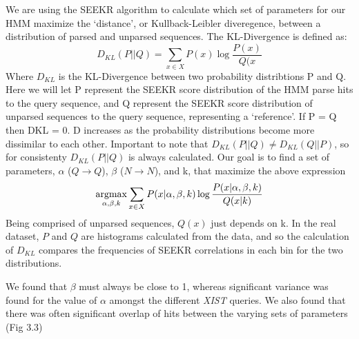 We are using the SEEKR algorithm to calculate which set of parameters for our HMM maximize the ‘distance’, or Kullback-Leibler diveregence, between a distribution of parsed and unparsed sequences.
The KL-Divergence is defined as:
\begin{equation}
    D_{KL}(P||Q) = \sum_{x\in X}P(x)\log{\frac{P(x)}{Q(x}}
\end{equation}
Where $D_{KL}$ is the KL-Divergence between two probability distribtions P and Q. Here we will let P represent the SEEKR score distribution of the HMM parse hits to the query sequence, and Q represent the SEEKR score distribution of unparsed sequences to the query sequence, representing a ‘reference’. If P = Q then DKL = 0. D increases as the probability distributions become more dissimilar to each other. Important to note that $D_{KL}(P||Q) \neq D_{KL}(Q||P)$, so for consistenty $D_{KL}(P||Q)$ is always calculated.
Our goal is to find a set of parameters, $\alpha$ ($Q\rightarrow Q$), $\beta$ ($N\rightarrow N$), and k, that maximize the above expression
\begin{equation}
    \operatorname*{argmax}_{\alpha,\beta,k}\sum_{x\in X}P(x|\alpha,\beta,k)\log{\frac{P(x|\alpha,\beta,k)}{Q(x|k)}}
\end{equation}
Being comprised of unparsed sequences, $Q(x)$ just depends on k.
In the real dataset, $P$ and $Q$ are histograms calculated from the data, and so the calculation of $D_{KL}$ compares the frequencies of SEEKR correlations in each bin for the two distributions. 

We found that $\beta$ must always be close to 1, whereas significant variance was found for the value of $\alpha$ amongst the different \emph{XIST} queries. We also found that there was often significant overlap of hits between the varying sets of parameters (Fig 3.3)


